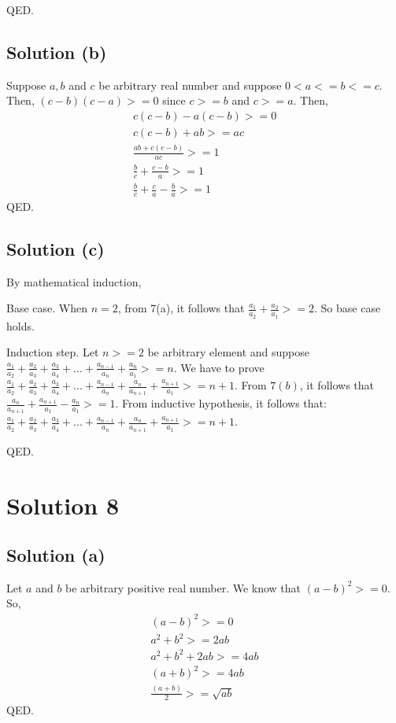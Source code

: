 \documentclass{article}
\begin{document}
QED.

\subsection{Solution (b)}
Suppose $a,b$ and $c$ be arbitrary real number and suppose $0 < a <= b
<= c$. Then, $(c-b)(c-a) >= 0$ since $c >= b$ and $c >= a$. Then,
\begin{align*}
  c(c-b)-a(c-b) >= 0 \\
  c(c-b) + ab >= ac \\
  \frac{ab + c(c-b)}{ac} >= 1 \\
  \frac{b}{c} + \frac{c-b}{a} >= 1 \\
  \frac{b}{c} + \frac{c}{a} - \frac{b}{a} >= 1
\end{align*}
QED.

\subsection{Solution (c)}
By mathematical induction,

Base case. When $n = 2$, from 7(a), it follows that $\frac{a_1}{a_2} +
\frac{a_2}{a_1} >= 2$. So base case holds.

Induction step. Let $n >= 2$ be arbitrary element and suppose
$\frac{a_1}{a_2} + \frac{a_2}{a_3} + \frac{a_3}{a_4} + ... +
\frac{a_{n-1}}{a_n} + \frac{a_n}{a_1} >= n$. We have to prove
$\frac{a_1}{a_2} + \frac{a_2}{a_3} + \frac{a_3}{a_4} + ... +
\frac{a_{n-1}}{a_n} + \frac{a_n}{a_{n+1}} + \frac{a_{n+1}}{a_1} >= n +
1$. From $7(b)$, it follows that $\frac{a_n}{a_{n+1}} +
\frac{a_{n+1}}{a_1} - \frac{a_n}{a_1} >= 1$.
From inductive hypothesis, it follows that:
$\frac{a_1}{a_2} + \frac{a_2}{a_3} + \frac{a_3}{a_4} + ... +
\frac{a_{n-1}}{a_n} + \frac{a_n}{a_{n+1}} +
\frac{a_{n+1}}{a_1} >= n + 1$.

QED.

\section{Solution 8}
\subsection{Solution (a)}
Let $a$ and $b$ be arbitrary positive real number. We know that
$(a-b)^2 >= 0$. So,
\begin{align*}
  (a-b)^2 >= 0 \\
  a^2 + b^2 >= 2ab \\
  a^2 + b^2 + 2ab >= 4ab \\
  (a+b)^2 >= 4ab \\
  \frac{(a+b)}{2} >= \sqrt{ab}
\end{align*}
QED.
\end{document}
